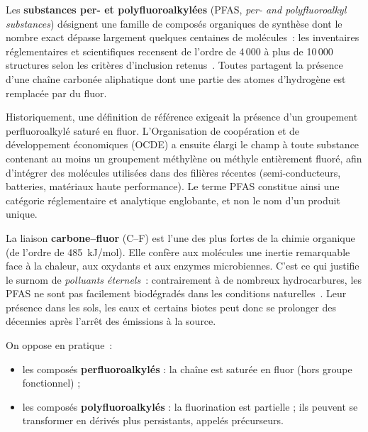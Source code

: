 \label{sec:pfas-proprietes}


Les \textbf{substances per- et polyfluoroalkyl\'ees} (PFAS, \emph{per- and polyfluoroalkyl substances}) d\'esignent une famille de compos\'es organiques de synth\`ese dont le nombre exact d\'epasse largement quelques centaines de mol\'ecules~: les inventaires r\'eglementaires et scientifiques recensent de l'ordre de 4\,000 \`a plus de 10\,000 structures selon les crit\`eres d'inclusion retenus~\cite{gluge2020pfas}.
Toutes partagent la pr\'esence d'une cha\^ine carbon\'ee aliphatique dont une partie des atomes d'hydrog\`ene est remplac\'ee par du fluor.

Historiquement, une d\'efinition de r\'ef\'erence exigeait la pr\'esence d'un groupement perfluoroalkyl\'e satur\'e en fluor.
L'Organisation de coop\'eration et de d\'eveloppement \'economiques (OCDE) a ensuite \'elargi le champ \`a toute substance contenant au moins un groupement m\'ethyl\`ene ou m\'ethyle enti\`erement fluor\'e, afin d'int\'egrer des mol\'ecules utilis\'ees dans des fili\`eres r\'ecentes (semi-conducteurs, batteries, mat\'eriaux haute performance).
Le terme PFAS constitue ainsi une cat\'egorie r\'eglementaire et analytique englobante, et non le nom d'un produit unique.



La liaison \textbf{carbone--fluor} (C--F) est l'une des plus fortes de la chimie organique (de l'ordre de 485~kJ/mol).
Elle conf\`ere aux mol\'ecules une inertie remarquable face \`a la chaleur, aux oxydants et aux enzymes microbiennes.
C'est ce qui justifie le surnom de \emph{polluants \'eternels}~: contrairement \`a de nombreux hydrocarbures, les PFAS ne sont pas facilement biod\'egrad\'es dans les conditions naturelles~\cite{prevedouros2006pfas}.
Leur pr\'esence dans les sols, les eaux et certains biotes peut donc se prolonger des d\'ecennies apr\`es l'arr\^et des \'emissions \`a la source.

On oppose en pratique~:
\begin{itemize}
    \item les compos\'es \textbf{perfluoroalkyl\'es} : la cha\^ine est satur\'ee en fluor (hors groupe fonctionnel) ;
    \item les compos\'es \textbf{polyfluoroalkyl\'es} : la fluorination est partielle ; ils peuvent se transformer en d\'eriv\'es plus persistants, appel\'es pr\'ecurseurs.
\end{itemize}

